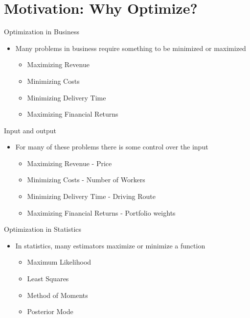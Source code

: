\documentclass[10pt]{beamer}
\begin{document}
\section{Motivation: Why Optimize?}
\begin{frame}{Optimization in Business}
  \begin{itemize}
  \item Many problems in business require something to be minimized or maximized
    \begin{itemize}
    \item Maximizing Revenue

    \item Minimizing Costs

    \item Minimizing Delivery Time

    \item Maximizing Financial Returns
    \end{itemize}
  \end{itemize}
\end{frame}
\begin{frame}{Input and output}
  \begin{itemize}
  \item For many of these problems there is some control over the input
    \begin{itemize}
    \item Maximizing Revenue - Price

    \item Minimizing Costs - Number of Workers

    \item Minimizing Delivery Time - Driving Route

    \item Maximizing Financial Returns - Portfolio weights
    \end{itemize}
  \end{itemize}
\end{frame}
\begin{frame}{Optimization in Statistics}
  \begin{itemize}
  \item In statistics, many estimators maximize or minimize a function

    \begin{itemize}
    \item Maximum Likelihood

    \item Least Squares

    \item Method of Moments

    \item Posterior Mode
    \end{itemize}
  \end{itemize}
\end{frame}
\end{document}
